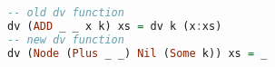 \begin{lstlisting}[language=Haskell]
-- old dv function
dv (ADD _ _ x k) xs = dv k (x:xs)
-- new dv function
dv (Node (Plus _ _) Nil (Some k)) xs = _
\end{lstlisting}


% 
